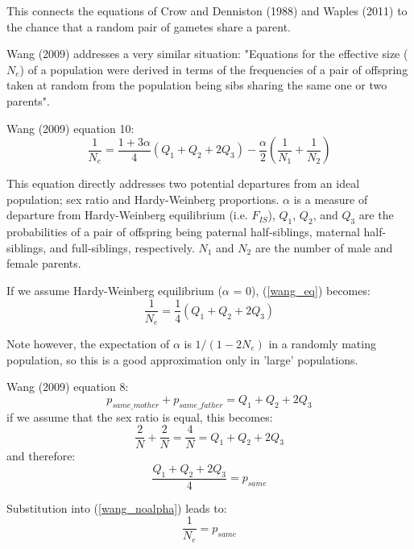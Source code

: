 \documentclass{article}
\begin{document}
\begin{description}
This connects the equations of Crow and Denniston (1988) and Waples (2011) to the chance that a random pair of gametes share a parent.

\item Wang (2009) addresses a very similar situation: "Equations for the effective size ($N_e$) of a population were derived in terms of the frequencies of a pair of offspring taken at random from the population being sibs sharing the same one or two parents".

Wang (2009) equation 10:
\begin{equation} \label{wang_eq}
\frac{1}{N_e} = \frac{1+3\alpha}{4}(Q_1+Q_2+2Q_3)-\frac{\alpha}{2}(\frac{1}{N_1}+\frac{1}{N_2})
\end{equation}

This equation directly addresses two potential departures from an ideal population; sex ratio and Hardy-Weinberg proportions. $\alpha$ is a measure of departure from Hardy-Weinberg equilibrium (i.e. $F_{IS}$), $Q_1$, $Q_2$, and $Q_3$ are the probabilities of a pair of offspring being paternal half-siblings, maternal half-siblings, and full-siblings, respectively. $N_1$ and $N_2$ are the number of male and female parents.

If we assume Hardy-Weinberg equilibrium ($\alpha$ = 0),  (\ref{wang_eq}) becomes:
\begin{equation} \label{wang_noalpha}
\frac{1}{N_e} = \frac{1}{4}(Q_1+Q_2+2Q_3)
\end{equation}

Note however, the expectation of $\alpha$ is $1/(1-2N_e)$ in a randomly mating population, so this is a good approximation only in 'large' populations.

Wang (2009) equation 8:
\begin{equation}
p_{same\_mother} + p_{same\_father} = Q_1+Q_2+2Q_3
\end{equation}
if we assume that the sex ratio is equal, this becomes:
\begin{equation}
\frac{2}{N} + \frac{2}{N} =\frac{4}{N} =  Q_1+Q_2+2Q_3
\end{equation}
and therefore: 
\begin{equation}
\frac{Q_1+Q_2+2Q_3}{4} = p_{same}
\end{equation}


Substitution into (\ref{wang_noalpha}) leads to:
\begin{equation} 
\frac{1}{N_e} = p_{same}
\end{equation}


\end{description}
\end{document}
